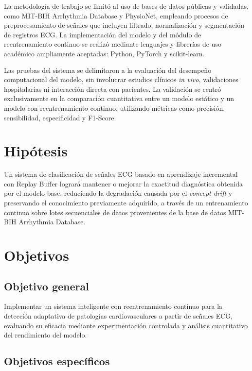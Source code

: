 La metodología de trabajo se limitó al uso de bases de datos públicas y validadas, como MIT-BIH Arrhythmia Database y PhysioNet, empleando procesos de preprocesamiento de señales que incluyen filtrado, normalización y segmentación de registros ECG. La implementación del modelo y del módulo de reentrenamiento continuo se realizó mediante lenguajes y librerías de uso académico ampliamente aceptadas: Python, PyTorch y scikit-learn.

Las pruebas del sistema se delimitaron a la evaluación del desempeño computacional del modelo, sin involucrar estudios clínicos \textit{in vivo}, validaciones hospitalarias ni interacción directa con pacientes. La validación se centró exclusivamente en la comparación cuantitativa entre un modelo estático y un modelo con reentrenamiento continuo, utilizando métricas como precisión, sensibilidad, especificidad y F1-Score.

\section{Hipótesis}

Un sistema de clasificación de señales ECG basado en aprendizaje incremental con Replay Buffer logrará mantener o mejorar la exactitud diagnóstica obtenida por el modelo base, reduciendo la degradación causada por el \textit{concept drift} y preservando el conocimiento previamente adquirido, a través de un entrenamiento continuo sobre lotes secuenciales de datos provenientes de la base de datos MIT-BIH Arrhythmia Database.

\section{Objetivos}

\subsection{Objetivo general}

Implementar un sistema inteligente con reentrenamiento continuo para la detección adaptativa de patologías cardiovasculares a partir de señales ECG, evaluando su eficacia mediante experimentación controlada y análisis cuantitativo del rendimiento del modelo.

\subsection{Objetivos específicos}

